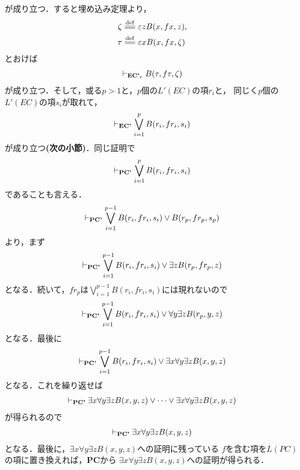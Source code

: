 	が成り立つ．すると埋め込み定理より，
	\begin{align}
		\zeta &\defeq \varepsilon z B(x,fx,z), \\
		\tau &\defeq \varepsilon x B(x,fx,\zeta)
	\end{align}
	とおけば
	\begin{align}
		\vdash_{{\scriptsize \mbox{{\bf EC'}${}_{\varepsilon}$}}} B(\tau,f\tau,\zeta)
	\end{align}
	が成り立つ．そして，或る$p>1$と，$p$個の$L'(EC)$の項$r_{i}$と，
	同じく$p$個の$L'(EC)$の項$s_{i}$が取れて，
	\begin{align}
		\vdash_{{\scriptsize \mbox{{\bf EC'}}}} \bigvee_{i=1}^{p} B(r_{i},fr_{i},s_{i})
	\end{align}
	が成り立つ{\bf (次の小節)}．同じ証明で
	\begin{align}
		\vdash_{{\scriptsize \mbox{{\bf PC'}}}} \bigvee_{i=1}^{p} B(r_{i},fr_{i},s_{i})
	\end{align}
	であることも言える．
	\begin{align}
		\vdash_{{\scriptsize \mbox{{\bf PC'}}}} \bigvee_{i=1}^{p-1} B(r_{i},fr_{i},s_{i})
		\vee B(r_{p},fr_{p},s_{p})
	\end{align}
	より，まず
	\begin{align}
		\vdash_{{\scriptsize \mbox{{\bf PC'}}}} \bigvee_{i=1}^{p-1} B(r_{i},fr_{i},s_{i})
		\vee \exists z B(r_{p},fr_{p},z)
	\end{align}
	となる．続いて，$fr_{p}$は$\bigvee_{i=1}^{p-1} B(r_{i},fr_{i},s_{i})$には現れないので
	\begin{align}
		\vdash_{{\scriptsize \mbox{{\bf PC'}}}} \bigvee_{i=1}^{p-1} B(r_{i},fr_{i},s_{i})
		\vee \forall y \exists z B(r_{p},y,z)
	\end{align}
	となる．最後に
	\begin{align}
		\vdash_{{\scriptsize \mbox{{\bf PC'}}}} \bigvee_{i=1}^{p-1} B(r_{i},fr_{i},s_{i})
		\vee \exists x \forall y \exists z B(x,y,z)
	\end{align}
	となる．これを繰り返せば
	\begin{align}
		\vdash_{{\scriptsize \mbox{{\bf PC'}}}} \exists x \forall y \exists z B(x,y,z)
		\vee \cdots \vee \exists x \forall y \exists z B(x,y,z)
	\end{align}
	が得られるので
	\begin{align}
		\vdash_{{\scriptsize \mbox{{\bf PC'}}}} \exists x \forall y \exists z B(x,y,z)
	\end{align}
	となる．最後に，$\exists x \forall y \exists z B(x,y,z)$への証明に残っている
	$f$を含む項を$L(PC)$の項に置き換えれば，{\bf PC}から
	$\exists x \forall y \exists z B(x,y,z)$への証明が得られる．
	

